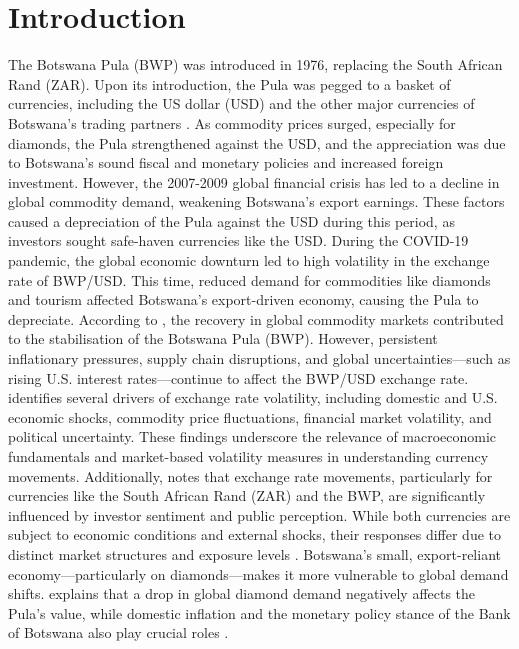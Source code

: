 \documentclass[a4paper]{article}
\theoremstyle{plain}
\theoremstyle{definition}
\theoremstyle{remark}
\begin{document}
\section{Introduction}\label{Intro}
The Botswana Pula (BWP) was introduced in 1976, replacing the South African Rand (ZAR). Upon its introduction, the Pula was pegged to a basket of currencies, including the US dollar (USD) and the other major currencies of Botswana’s trading partners \citep{Thupeng2021}. As commodity prices surged, especially for diamonds, the Pula strengthened against the USD, and the appreciation was due to Botswana's sound fiscal and monetary policies and increased foreign investment. However, the 2007-2009 global financial crisis has led to a decline in global commodity demand, weakening Botswana’s export earnings. 
These factors caused a depreciation of the Pula against the USD during this period, as investors sought safe-haven currencies like the USD. During the COVID-19 pandemic, the global economic downturn led to high volatility in the exchange rate of BWP/USD. This time, reduced demand for commodities like diamonds and tourism affected Botswana's export-driven economy, causing the Pula to depreciate. According to \cite{WCER2024}, the recovery in global commodity markets contributed to the stabilisation of the Botswana Pula (BWP). However, persistent inflationary pressures, supply chain disruptions, and global uncertainties—such as rising U.S. interest rates—continue to affect the BWP/USD exchange rate. \cite{Mavee2016} identifies several drivers of exchange rate volatility, including domestic and U.S. economic shocks, commodity price fluctuations, financial market volatility, and political uncertainty. These findings underscore the relevance of macroeconomic fundamentals and market-based volatility measures in understanding currency movements. Additionally, \cite{Gue2022} notes that exchange rate movements, particularly for currencies like the South African Rand (ZAR) and the BWP, are significantly influenced by investor sentiment and public perception. While both currencies are subject to economic conditions and external shocks, their responses differ due to distinct market structures and exposure levels \citep{israel2023relationship}. Botswana's small, export-reliant economy—particularly on diamonds—makes it more vulnerable to global demand shifts. \cite{Botlhale2021} explains that a drop in global diamond demand negatively affects the Pula’s value, while domestic inflation and the monetary policy stance of the Bank of Botswana also play crucial roles \citep{Leith2020}.
\end{document}
